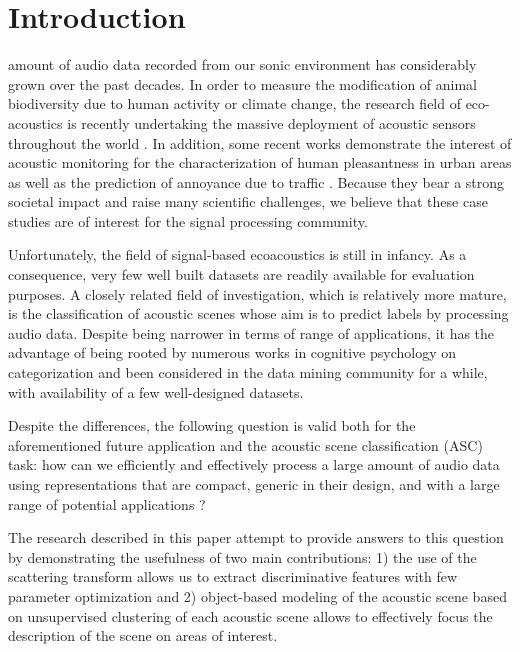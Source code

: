 \documentclass[journal]{IEEEtran}
\begin{document}
\section{Introduction}

 amount of audio data recorded from our sonic environment has considerably grown over the past decades.
In order to measure the modification of animal biodiversity due to human activity or climate change, the research field of eco-acoustics \cite{ECOACOUSTICS2014, krause} is recently undertaking the massive deployment of acoustic sensors throughout the world \cite{warren2006urban, NessSST13, stowell13a, stowell13b}.
In addition, some recent works demonstrate the interest of acoustic monitoring for the characterization of human pleasantness in urban areas \cite{lafayPartI, guyot2005urban, ricciardi2015sound} as well as the prediction of annoyance due to traffic \cite{gloaguen}.
Because they bear a strong societal impact and raise many scientific challenges, we believe that these case studies are of interest for the signal processing community.

Unfortunately, the field of signal-based ecoacoustics is still in infancy.
As a consequence, very few well built datasets are readily available for evaluation purposes.
A closely related field of investigation, which is relatively more mature, is the classification of acoustic scenes whose aim is to predict labels by processing audio data.
Despite being narrower in terms of range of applications, it has the advantage of being rooted by numerous works in cognitive psychology on categorization \cite{dubois2006cognitive, maffiolo_caracterisation_1999, guastavino_ideal_2006} and been considered in the data mining community for a while, with availability of a few well-designed datasets. 

Despite the differences, the following question is valid both for the aforementioned future application and the acoustic scene classification (ASC) task: how can we efficiently and effectively process a large amount of audio data using representations that are compact, generic in their design, and with a large range of potential applications ?  

The research described in this paper attempt to provide answers to this question by demonstrating the usefulness of two main contributions: 1) the use of the scattering transform allows us to extract discriminative features with few parameter optimization and 2) object-based modeling of the acoustic scene based on unsupervised clustering of each acoustic scene allows to effectively focus the description of the scene on areas of interest.
\end{document}
